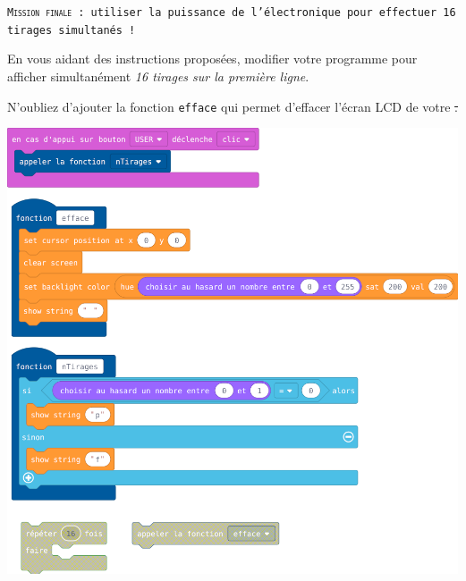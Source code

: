 \begin{eleve}    
    \texttt{\textsc{Mission finale} : utiliser la puissance de l'électronique pour effectuer 16 tirages simultanés !}
    
    \begin{minipage}[t]{0.3\linewidth}\raggedright
        En vous aidant des instructions proposées, modifier votre programme pour afficher simultanément \emph{16 tirages sur la première ligne}.
    
        N'oubliez d'ajouter la fonction \texttt{efface} qui permet d'effacer l'écran LCD de votre \st. 
    \end{minipage}
    \hfill
    \begin{minipage}[t]{0.65\linewidth}
        \centering
        \vspace{0pt}
        \includegraphics[width=\linewidth]{res/st-pf-02-eleve.png}
    \end{minipage}
\end{eleve}

\newpage

